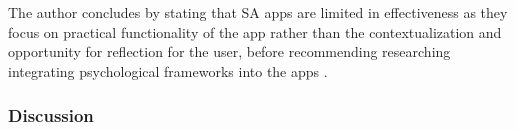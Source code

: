 \documentclass[12pt]{article}
\begin{document}


The author concludes by stating that SA apps are limited in effectiveness as they focus on practical
functionality of the app rather than the contextualization and opportunity for reflection for the user, before
recommending researching integrating psychological frameworks into the apps
\autocite{RefWorks:RefID:35-dosselaar2017smartphone}.

\subsubsection{Discussion}
\end{document}

